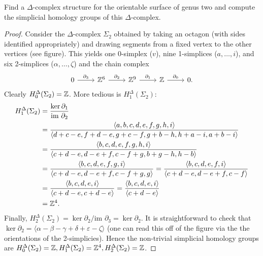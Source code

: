 \documentclass{../../mathnotes}
\begin{document}
\begin{prop}
    Find a $\Delta$-complex structure for the orientable surface of genus two and compute
    the simplicial homology groups of this $\Delta$-complex.
\end{prop}
\begin{proof}
    Consider the $\Delta$-complex $\Sigma_2$ obtained by taking an octagon (with sides identified
    appropriately) and drawing segments from a fixed vertex to the other vertices (see figure). This
    yields one 0-simplex ($v$), nine 1-simplices ($a,\ldots, i$), and six 2-simplices ($\alpha,\ldots,\zeta$)
    and the chain complex
    \begin{equation*}
        \begin{tikzcd}
            0\arrow{r}{\partial_3}&\Z^6\arrow{r}{\partial_2}&\Z^9\arrow{r}{\partial_1}&\Z\arrow{r}{\partial_0}&0.
        \end{tikzcd}
    \end{equation*}
    Clearly $H^\Delta_0(\Sigma_2)=\mathbb{Z}$. More tedious is $H_1^\Delta(\Sigma_2)$:
    \begin{align*}
        H^\Delta_1(\Sigma_2)&=\frac{\ker\partial_1}{\text{im }\partial_2}\\
        &=\frac{\langle a,b,c,d,e,f,g,h,i\rangle}{\langle d+c-e,f+d-e,g+c-f,g+b-h,h+a-i,a+b-i\rangle}\\
        &=\frac{\langle b,c,d,e,f,g,h,i\rangle}{\langle c+d-e,d-e+f,c-f+g,b+g-h,h-b\rangle}\\
        &=\frac{\langle b,c,d,e,f,g,i\rangle}{\langle c+d-e,d-e+f,c-f+g,g\rangle}
        =\frac{\langle b,c,d,e,f,i \rangle}{\langle c+d-e,d-e+f,c-f\rangle}\\
        &=\frac{\langle b,c,d,e,i\rangle}{\langle c+d-e,c+d-e\rangle}=\frac{\langle b,c,d,e,i\rangle}{\langle c+d-e\rangle}\\
        &=\mathbb{Z}^4.
    \end{align*}
    Finally, $H_2^\Delta(\Sigma_2)=\ker\partial_2/\text{im }\partial_3=\ker\partial_2$. It is straightforward to check that
    $\ker\partial_2=\langle\alpha-\beta-\gamma+\delta+\varepsilon-\zeta\rangle$ (one can read this off of the figure via the
    the orientations of the 2-simplicies). Hence the non-trivial simplicial homology groups are $H^\Delta_0(\Sigma_2)=\mathbb{Z},
    H^\Delta_1(\Sigma_2)=\mathbb{Z}^4,H^\Delta_2(\Sigma_2)=\mathbb{Z}$.
\end{proof}
\end{document}
